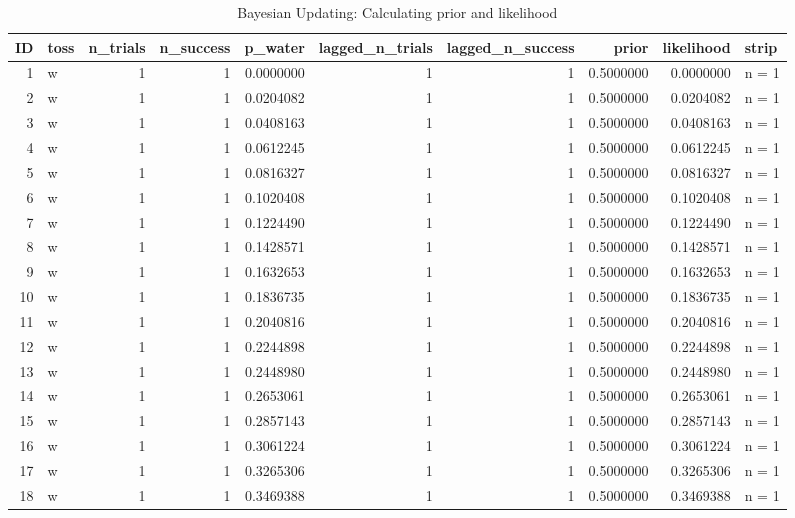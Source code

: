 \documentclass[
  letterpaper,
  DIV=11,
  numbers=noendperiod]{scrreprt}
\begin{document}
\hypertarget{tbl-bayesian-model-learning-anno5}{}
\begin{table}
\caption{\label{tbl-bayesian-model-learning-anno5}Bayesian Updating: Calculating prior and likelihood }\tabularnewline

\centering
\begin{tabular}[t]{r|l|r|r|r|r|r|r|r|l}
\hline
ID & toss & n\_trials & n\_success & p\_water & lagged\_n\_trials & lagged\_n\_success & prior & likelihood & strip\\
\hline
1 & w & 1 & 1 & 0.0000000 & 1 & 1 & 0.5000000 & 0.0000000 & n = 1\\
\hline
2 & w & 1 & 1 & 0.0204082 & 1 & 1 & 0.5000000 & 0.0204082 & n = 1\\
\hline
3 & w & 1 & 1 & 0.0408163 & 1 & 1 & 0.5000000 & 0.0408163 & n = 1\\
\hline
4 & w & 1 & 1 & 0.0612245 & 1 & 1 & 0.5000000 & 0.0612245 & n = 1\\
\hline
5 & w & 1 & 1 & 0.0816327 & 1 & 1 & 0.5000000 & 0.0816327 & n = 1\\
\hline
6 & w & 1 & 1 & 0.1020408 & 1 & 1 & 0.5000000 & 0.1020408 & n = 1\\
\hline
7 & w & 1 & 1 & 0.1224490 & 1 & 1 & 0.5000000 & 0.1224490 & n = 1\\
\hline
8 & w & 1 & 1 & 0.1428571 & 1 & 1 & 0.5000000 & 0.1428571 & n = 1\\
\hline
9 & w & 1 & 1 & 0.1632653 & 1 & 1 & 0.5000000 & 0.1632653 & n = 1\\
\hline
10 & w & 1 & 1 & 0.1836735 & 1 & 1 & 0.5000000 & 0.1836735 & n = 1\\
\hline
11 & w & 1 & 1 & 0.2040816 & 1 & 1 & 0.5000000 & 0.2040816 & n = 1\\
\hline
12 & w & 1 & 1 & 0.2244898 & 1 & 1 & 0.5000000 & 0.2244898 & n = 1\\
\hline
13 & w & 1 & 1 & 0.2448980 & 1 & 1 & 0.5000000 & 0.2448980 & n = 1\\
\hline
14 & w & 1 & 1 & 0.2653061 & 1 & 1 & 0.5000000 & 0.2653061 & n = 1\\
\hline
15 & w & 1 & 1 & 0.2857143 & 1 & 1 & 0.5000000 & 0.2857143 & n = 1\\
\hline
16 & w & 1 & 1 & 0.3061224 & 1 & 1 & 0.5000000 & 0.3061224 & n = 1\\
\hline
17 & w & 1 & 1 & 0.3265306 & 1 & 1 & 0.5000000 & 0.3265306 & n = 1\\
\hline
18 & w & 1 & 1 & 0.3469388 & 1 & 1 & 0.5000000 & 0.3469388 & n = 1\\
\hline

\end{tabular}
\end{table}
\end{document}

